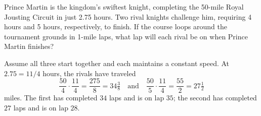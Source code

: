 Prince Martin is the kingdom's swiftest knight, completing the 50-mile Royal Jousting Circuit in just 2.75 hours. Two rival knights challenge him, requiring 4 hours and 5 hours, respectively, to finish. If the course loops around the tournament grounds in 1-mile laps, what lap will each rival be on when Prince Martin finishes?

\begin{solution}
Assume all three start together and each maintains a constant speed.
At $2.75=11/4$ hours, the rivals have traveled
\[
\frac{50}{4}\cdot\frac{11}{4}=\frac{275}{8}=34\tfrac38
\quad\text{and}\quad
\frac{50}{5}\cdot\frac{11}{4}=\frac{55}{2}=27\tfrac12
\]
miles. The first has completed $34$ laps and is on
$\boxed{\text{lap }35}$; the second has completed $27$ laps and is on
$\boxed{\text{lap }28}$.
\end{solution}
